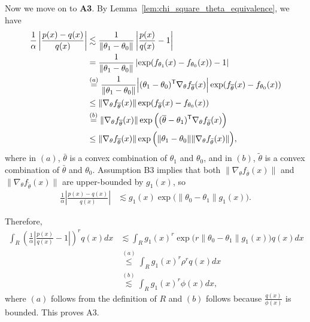 \documentclass{article}
\begin{document}
Now we move on to \textbf{A3}. By Lemma~\ref{lem:chi_square_theta_equivalence}, we have
\begin{align*}
\frac{1}{\alpha} \left| \frac{p(x) - q(x)}{q(x)} \right| &\lesssim 
    \frac{1}{\| \theta_1 - \theta_0\|}  \left| \frac{p(x)}{q(x)} - 1 \right| \\
%
 &=  \frac{1}{\| \theta_1 - \theta_0\|}  
        \left| \exp( f_{\theta_1}(x) - f_{\theta_0}(x) ) - 1 \right| \\
%
   & \stackrel{(a)} =  \frac{1}{\| \theta_1 - \theta_0\|} \Big|(\theta_1 - \theta_0)^\tran \nabla_{\theta} f_{\bar{\theta}}(x)  \Big|
      \exp( f_{\bar{\theta}}(x) - f_{\theta_0}(x)) \\
  &\leq \| \nabla_{\theta} f_{\bar{\theta}}(x) \|   \exp( f_{\bar{\theta}}(x) - f_{\theta_0}(x)) \\
%
  &\stackrel{(b)} = \|  \nabla_{\theta} f_{\bar{\theta}}(x) \| 
       \exp\Big( (\bar{\theta} - \theta_1)^\tran \nabla_{\theta} f_{\tilde{\theta}}(x) \Big) \\
  &\leq  \|  \nabla_{\theta} f_{\bar{\theta}}(x) \| 
        \exp\Big( \| \theta_1 - \theta_0\| \| \nabla_{\theta} f_{\tilde{\theta}}(x) \| \Big),
\end{align*}
where in $(a)$, $\bar{\theta}$ is a convex combination of $\theta_1$ and $\theta_0$, and in $(b)$, $\tilde{\theta}$ is a convex combination of $\bar{\theta}$ and $\theta_0$. Assumption B3 implies that both $\| \nabla_\theta f_{\bar{\theta}}(x) \|$ and 
$\| \nabla_\theta f_{\tilde{\theta}}(x) \|$ are upper-bounded by $g_1(x)$, so
\begin{align}
\frac{1}{\alpha} \left| \frac{p(x) - q(x)}{q(x)} \right| &\lesssim
         g_1(x) \exp\big( \| \theta_0 - \theta_1 \| g_1(x) \big). \label{eqn:gamma_bound_function}
\end{align}

Therefore,
\begin{align*}
\int_R \left( \frac{1}{\alpha} \left| \frac{p(x)}{q(x)} - 1 \right| \right)^r q(x) dx &\lesssim 
    \int_R  g_1(x)^r \exp\big(r \| \theta_0 - \theta_1 \| g_1(x) \big)  q(x) dx \\
  &\stackrel{(a)} \leq \int_R g_1(x)^r \rho^r q(x) dx \\
  &\stackrel{(b)} \lesssim \int_R g_1(x)^r \phi(x) dx,
\end{align*}
where $(a)$ follows from the definition of $R$ and $(b)$ follows because $\frac{q(x)}{\phi(x)}$ is bounded. This proves A3. 
\end{document}
